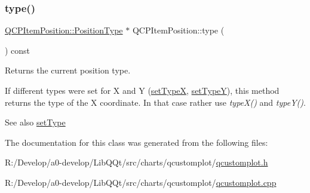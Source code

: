 \mbox{\label{class_q_c_p_item_position_abfd74d86bd799306ce0295ffe433bdfc}} 
\subsubsection{\texorpdfstring{type()}{type()}}
{\footnotesize\ttfamily \mbox{\hyperlink{class_q_c_p_item_position_aad9936c22bf43e3d358552f6e86dbdc8}{Q\+C\+P\+Item\+Position\+::\+Position\+Type}} $\ast$ Q\+C\+P\+Item\+Position\+::type (\begin{DoxyParamCaption}{ }\end{DoxyParamCaption}) const\hspace{0.3cm}{\ttfamily [inline]}}

Returns the current position type.

If different types were set for X and Y (\mbox{\hyperlink{class_q_c_p_item_position_a2113b2351d6d00457fb3559a4e20c3ea}{set\+TypeX}}, \mbox{\hyperlink{class_q_c_p_item_position_ac2a454aa5a54c1615c50686601ec4510}{set\+TypeY}}), this method returns the type of the X coordinate. In that case rather use {\itshape type\+X()} and {\itshape type\+Y()}.

\begin{DoxySeeAlso}{See also}
\mbox{\hyperlink{class_q_c_p_item_position_aa476abf71ed8fa4c537457ebb1a754ad}{set\+Type}} 
\end{DoxySeeAlso}


The documentation for this class was generated from the following files\+:\begin{DoxyCompactItemize}
\item 
R\+:/\+Develop/a0-\/develop/\+Lib\+Q\+Qt/src/charts/qcustomplot/\mbox{\hyperlink{qcustomplot_8h}{qcustomplot.\+h}}\item 
R\+:/\+Develop/a0-\/develop/\+Lib\+Q\+Qt/src/charts/qcustomplot/\mbox{\hyperlink{qcustomplot_8cpp}{qcustomplot.\+cpp}}\end{DoxyCompactItemize}

